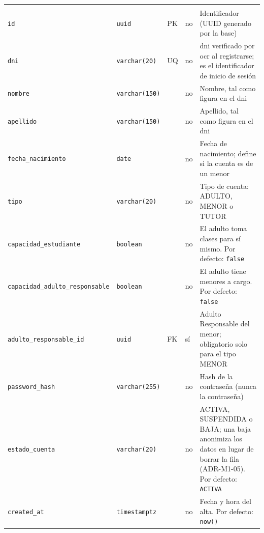 {\small
\begin{xltabular}{\textwidth}{@{}>{\raggedright\arraybackslash}p{3.6cm} >{\raggedright\arraybackslash}p{2.3cm} >{\raggedright\arraybackslash}p{1cm} >{\centering\arraybackslash}p{0.85cm} L@{}}
    \toprule
     &  &  &  &  \\
    \midrule
    \endfirsthead
    \toprule
     &  &  &  &  \\
    \midrule
    \endhead
    \bottomrule
    \endfoot
    \texttt{id} & \texttt{uuid} & PK & no & Identificador (UUID generado por la base) \\
    \texttt{dni} & \texttt{varchar(\allowbreak{}20)} & UQ & no & \gls{dni} verificado por \gls{ocr} al registrarse; es el identificador de inicio de sesión \\
    \texttt{nombre} & \texttt{varchar(\allowbreak{}150)} &  & no & Nombre, tal como figura en el \gls{dni} \\
    \texttt{apellido} & \texttt{varchar(\allowbreak{}150)} &  & no & Apellido, tal como figura en el \gls{dni} \\
    \texttt{fecha\_\allowbreak{}nacimiento} & \texttt{date} &  & no & Fecha de nacimiento; define si la cuenta es de un menor \\
    \texttt{tipo} & \texttt{varchar(\allowbreak{}20)} &  & no & Tipo de cuenta: ADULTO, MENOR o TUTOR \\
    \texttt{capacidad\_\allowbreak{}estudiante} & \texttt{boolean} &  & no & El adulto toma clases para sí mismo. Por defecto: \texttt{false} \\
    \texttt{capacidad\_\allowbreak{}adulto\_\allowbreak{}responsable} & \texttt{boolean} &  & no & El adulto tiene menores a cargo. Por defecto: \texttt{false} \\
    \texttt{adulto\_\allowbreak{}responsable\_\allowbreak{}id} & \texttt{uuid} & FK & sí & Adulto Responsable del menor; obligatorio solo para el tipo MENOR \\
    \texttt{password\_\allowbreak{}hash} & \texttt{varchar(\allowbreak{}255)} &  & no & Hash de la contraseña (nunca la contraseña) \\
    \texttt{estado\_\allowbreak{}cuenta} & \texttt{varchar(\allowbreak{}20)} &  & no & ACTIVA, SUSPENDIDA o BAJA; una baja anonimiza los datos en lugar de borrar la fila (ADR-M1-05). Por defecto: \texttt{\textquotesingle{}ACTIVA\textquotesingle{}} \\
    \texttt{created\_\allowbreak{}at} & \texttt{timestamptz} &  & no & Fecha y hora del alta. Por defecto: \texttt{now(\allowbreak{})} \\

\end{xltabular}}
